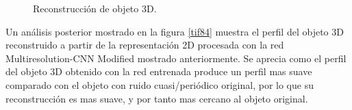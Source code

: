 \documentclass[10pt,letterpaper]{article}
\begin{document}
\begin{figure}[H]
      \begin{center}
        \caption{Reconstrucción de objeto 3D.}
        \label{tif818283}
      \end{center}
\end{figure}

Un análisis posterior mostrado en la figura \ref{tif84} muestra el perfil del objeto 3D reconstruido a partir de la representación 2D procesada con la red Multiresolution-CNN Modified mostrado anteriormente. Se aprecia como el perfil del objeto 3D obtenido con la red entrenada produce un perfil mas suave comparado con el objeto con ruido cuasi/periódico original, por lo que su reconstrucción es mas suave, y por tanto mas cercano al objeto original.  
\end{document}

